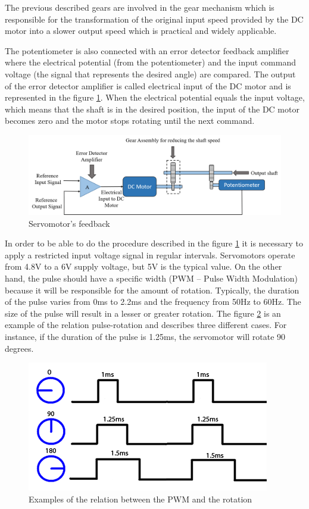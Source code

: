The previous described gears are involved in the gear mechanism which is responsible for the transformation of the original input speed provided by the DC motor into a slower output speed which is practical and widely applicable. 

The potentiometer is also connected with an error detector feedback amplifier where the electrical potential (from the potentiometer) and the input command voltage (the signal that represents the desired angle) are compared. The output of the error detector amplifier is called electrical input of the DC motor and is represented in the figure \ref{servomotor_expl3}. When the electrical potential equals the input voltage, which means that the shaft is in the desired position, the input of the DC motor becomes zero and the motor stops rotating until the next command.

\begin{figure}[H]
\centering
\includegraphics[scale=0.6]{figures/servomotor_expl3new.png}
\caption{Servomotor’s feedback}
\label{servomotor_expl3}
\end{figure}

In order to be able to do the procedure described in the figure \ref{servomotor_expl3} it is necessary to apply a restricted input voltage signal in regular intervals. Servomotors operate from 4.8V to a 6V supply voltage, but 5V is the typical value. On the other hand, the pulse should have a specific width (PWM – Pulse Width Modulation) because it will be responsible for the amount of rotation. Typically, the duration of the pulse varies from 0ms to 2.2ms and the frequency from 50Hz to 60Hz. The size of the pulse will result in a lesser or greater rotation. The figure \ref{signal_servo} is an example of the relation pulse-rotation and describes three different cases. For instance, if the duration of the pulse is 1.25ms, the servomotor will rotate 90 degrees.

\begin{figure}[H]
\centering
\includegraphics[scale=0.5]{figures/signal_servo.jpg}
\caption{Examples of the relation between the PWM and the rotation}
\label{signal_servo}
\end{figure}

